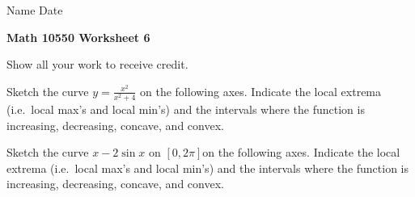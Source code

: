 \documentclass[12pt]{article}
\begin{document}
\hskip0.01in Name \underline{\hskip 4.5in}
\hskip0.2in
  Date \underline{\hskip 1in}


\begin{center}
\textbf{Math 10550 Worksheet 6}

Show all your work to receive credit.
\end{center}

\noindent
 

 Sketch the curve $\displaystyle y = \frac{x^{2}}{x^2 +
    4}$ on the following axes. Indicate the local extrema (i.e.\ local max's and
local min's) and the intervals where the function is
increasing, decreasing, concave, and convex. 
\vspace{2em}
\begin{center}
\end{center}
\newpage
\noindent
{} Sketch the curve $\displaystyle x - 2\sin x$ on $[0, 2\pi]$on the following axes. Indicate the local extrema (i.e.\ local max's and
local min's) and the intervals where the function is
increasing, decreasing, concave, and convex.

\vspace{2em}
\begin{center}
\end{center}
\end{document}
